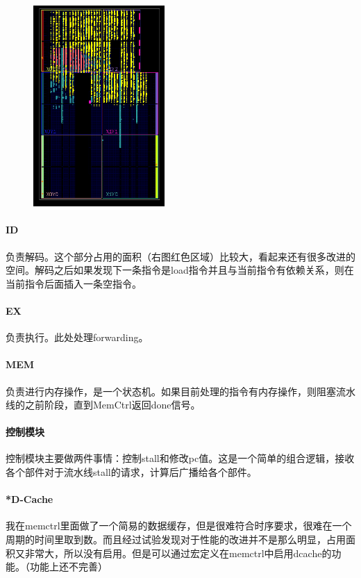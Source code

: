 \documentclass[UTF8]{ctexart}
\begin{document}
	\begin{figure}
		\includegraphics[width=5cm]{impl.png}
	\end{figure}
	
	\paragraph{ID} 负责解码。这个部分占用的面积（右图红色区域）比较大，看起来还有很多改进的空间。解码之后如果发现下一条指令是load指令并且与当前指令有依赖关系，则在当前指令后面插入一条空指令。
	

	
	\paragraph{EX} 负责执行。此处处理forwarding。
	\paragraph{MEM} 负责进行内存操作，是一个状态机。如果目前处理的指令有内存操作，则阻塞流水线的之前阶段，直到MemCtrl返回done信号。
	\paragraph{控制模块} 控制模块主要做两件事情：控制stall和修改pc值。这是一个简单的组合逻辑，接收各个部件对于流水线stall的请求，计算后广播给各个部件。
	\paragraph{*D-Cache} 我在memctrl里面做了一个简易的数据缓存，但是很难符合时序要求，很难在一个周期的时间里取到数。而且经过试验发现对于性能的改进并不是那么明显，占用面积又非常大，所以没有启用。但是可以通过宏定义在memctrl中启用dcache的功能。（功能上还不完善）
	
\end{document}
